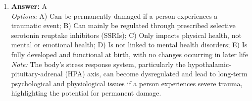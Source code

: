 \documentclass[12pt]{article}
\begin{document}
\begin{enumerate}[label=\arabic*.]
\\ \textit{Note:} Stimulant medications, while primarily used to treat attention-related disorders, can paradoxically reduce anxiety symptoms in some individuals by enhancing focus and decreasing distractibility, thereby improving their overall coping mechanisms in anxiety-provoking situations.
\item \textbf{Answer:} A
\\ \textit{Options:} A) Can be permanently damaged if a person experiences a traumatic event; B) Can mainly be regulated through prescribed selective serotonin reuptake inhibitors (SSRIs); C) Only impacts physical health, not mental or emotional health; D) Is not linked to mental health disorders; E) Is fully developed and functional at birth, with no changes occurring in later life
\\ \textit{Note:} The body's stress response system, particularly the hypothalamic-pituitary-adrenal (HPA) axis, can become dysregulated and lead to long-term psychological and physiological issues if a person experiences severe trauma, highlighting the potential for permanent damage.
\end{enumerate}
\end{document}
